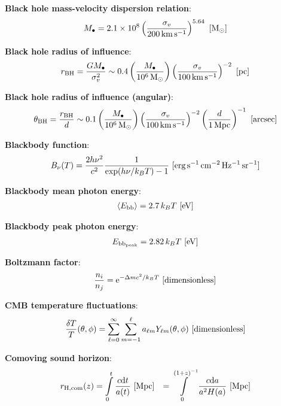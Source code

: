 \documentclass[a4paper,11pt]{article}
\begin{document}
{\noindent}\textbf{Black hole mass-velocity dispersion relation}:
\begin{align*}
    M_\bullet = 2.1\times 10^8\left(\frac{\sigma_v}{200\,{\rm km\,s^{-1}}}\right)^{5.64} ~ [{\rm M_\odot}]
\end{align*}

{\noindent}\textbf{Black hole radius of influence}:
\begin{align*}
    r_\mathrm{BH} = \frac{GM_\bullet}{\sigma_v^2} \sim 0.4\left(\frac{M_\bullet}{10^6\,{\rm M_\odot}}\right)\left(\frac{\sigma_v}{100\,{\rm km\,s^{-1}}}\right)^{-2} ~ [{\rm pc}]
\end{align*}

{\noindent}\textbf{Black hole radius of influence (angular)}:
\begin{align*}
    \theta_\mathrm{BH} = \frac{r_\mathrm{BH}}{d} \sim 0.1\left(\frac{M_\bullet}{10^6\,{\rm M_\odot}}\right) \left(\frac{\sigma_v}{100\,{\rm km\,s^{-1}}}\right)^{-2} \left(\frac{d}{1\,{\rm Mpc}}\right)^{-1} ~ [{\rm arcsec}]
\end{align*}

{\noindent}\textbf{Blackbody function}:
\begin{align*}
    B_\nu(T) = \frac{2h\nu^2}{c^2} \frac{1}{\exp(h\nu/k_BT) - 1} ~ [{\rm erg\,s^{-1}\,cm^{-2}\,Hz^{-1}\,sr^{-1}}]
\end{align*}

{\noindent}\textbf{Blackbody mean photon energy}:
\begin{align*}
    \langle E_\mathrm{bb} \rangle = 2.7\,k_BT  ~ [{\rm eV}]
\end{align*}

{\noindent}\textbf{Blackbody peak photon energy}:
\begin{align*}
    E_\mathrm{bb_{peak}} = 2.82\,k_BT ~ [{\rm eV}]
\end{align*}

{\noindent}\textbf{Boltzmann factor}:
\begin{align*}
    \frac{n_i}{n_j} = \mathrm{e}^{-\Delta mc^2/k_BT} ~ [{\rm dimensionless}]
\end{align*}

{\noindent}\textbf{CMB temperature fluctuations}:
\begin{align*}
    \frac{\delta T}{T}(\theta,\phi) = \sum\limits_{\ell=0}^{\infty}\sum\limits_{m=-1}^{\ell} a_{\ell m}Y_{\ell m}(\theta,\phi) ~ [{\rm dimensionless}]
\end{align*}

{\noindent}\textbf{Comoving sound horizon}:
\begin{align*}
    r_\mathrm{H,com}(z) &= \int\limits_0^t \frac{c\mathrm{d}t}{a(t)} ~ [{\rm Mpc}]
    &= \int\limits_0^{(1+z)^{-1}} \frac{c\mathrm{d}a}{a^2H(a)} ~ [{\rm Mpc}]
\end{align*}
\end{document}
